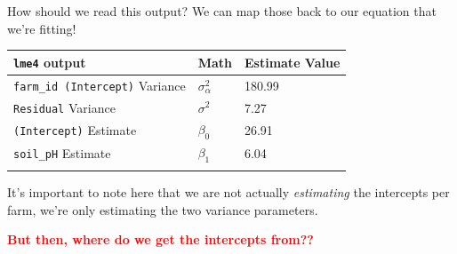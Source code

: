 \documentclass[
  ignorenonframetext,
  aspectratio=169,
]{beamer}
\begin{document}
\begin{frame}[fragile]{How should we read this output?}
\label{how-should-we-read-this-output}
We can map those back to our equation that we're fitting!

\vspace{0.5em}

\begin{longtable}[]{@{}lll@{}}
\toprule\noalign{}
\texttt{lme4} output & Math & Estimate Value \\
\midrule\noalign{}
\endhead
\texttt{farm\_id\ (Intercept)} Variance & \(\sigma^2_\alpha\) &
180.99 \\
\texttt{Residual} Variance & \(\sigma^2\) & 7.27 \\
\texttt{(Intercept)} Estimate & \(\beta_0\) & 26.91 \\
\texttt{soil\_pH} Estimate & \(\beta_1\) & 6.04 \\
\bottomrule\noalign{}
\end{longtable}

\pause

It's important to note here that we are not actually \emph{estimating}
the intercepts per farm, we're only estimating the two variance
parameters.

\pause

\begin{center}
\textbf{\textcolor{red}{But then, where do we get the intercepts from??}}
\end{center}
\end{frame}
\end{document}
